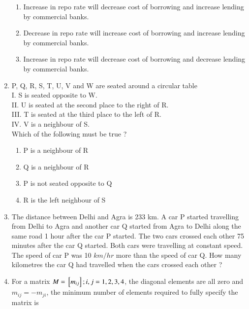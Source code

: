 \documentclass[journal]{IEEEtran}
\begin{document}
\begin{enumerate}
\begin{enumerate}
			\item Increase in repo rate will decrease cost of borrowing and increase lending by commercial banks.
			\item Decrease in repo rate will increase cost of borrowing and increase lending by commercial banks.
			\item Increase in repo rate will decrease cost of borrowing and decrease lending by commercial banks.
		\end{enumerate}
	\item P, Q, R, S, T, U, V and W are seated around a circular table \\
		I. S is seated opposite to W. \\
		II. U is seated at the second place to the right of R. \\
		III. T is seated at the third place to the left of R. \\
		IV. V is a neighbour of S. \\
		Which of the following must be true ?
		\begin{enumerate}
			\item P is a neighbour of R
			\item Q is a neighbour of R
			\item P is not seated opposite to Q
			\item R is the left neighbour of S
		\end{enumerate}
	\item The distance between Delhi and Agra is 233 km. A car P started travelling from Delhi to Agra and another car Q started from Agra to Delhi along the same road 1 hour after the car P started. The two cars crossed each other 75 minutes after the car Q started. Both cars were travelling at constant speed. The speed of car P was 10 $km/hr$ more than the speed of car Q. How many kilometres the car Q had travelled when the cars crossed each other ?
		\begin{enumerate}
		\end{enumerate}
	\item For a matrix $M = {}\left[m_{ij}\right] ; i,j = 1,2,3,4$, the diagonal elements are all zero and $m_{ij} = -m_{ji}$, the minimum number of elements required to fully specify the matrix is 

\end{enumerate}
\end{document}
